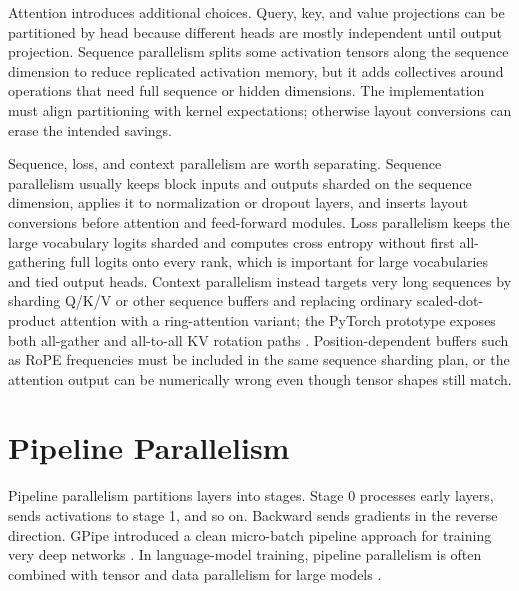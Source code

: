 Attention introduces additional choices. Query, key, and value projections can be partitioned by head because different heads are mostly independent until output projection. Sequence parallelism splits some activation tensors along the sequence dimension to reduce replicated activation memory, but it adds collectives around operations that need full sequence or hidden dimensions. The implementation must align partitioning with kernel expectations; otherwise layout conversions can erase the intended savings.

Sequence, loss, and context parallelism are worth separating. Sequence parallelism usually keeps block inputs and outputs sharded on the sequence dimension, applies it to normalization or dropout layers, and inserts layout conversions before attention and feed-forward modules. Loss parallelism keeps the large vocabulary logits sharded and computes cross entropy without first all-gathering full logits onto every rank, which is important for large vocabularies and tied output heads. Context parallelism instead targets very long sequences by sharding Q/K/V or other sequence buffers and replacing ordinary scaled-dot-product attention with a ring-attention variant; the PyTorch prototype exposes both all-gather and all-to-all KV rotation paths \cite{pytorch2025contextparallel}. Position-dependent buffers such as RoPE frequencies must be included in the same sequence sharding plan, or the attention output can be numerically wrong even though tensor shapes still match.

\section{Pipeline Parallelism}
\label{sec:pipeline-parallelism}

Pipeline parallelism partitions layers into stages. Stage 0 processes early layers, sends activations to stage 1, and so on. Backward sends gradients in the reverse direction. GPipe introduced a clean micro-batch pipeline approach for training very deep networks \cite{huang2019gpipe}. In language-model training, pipeline parallelism is often combined with tensor and data parallelism for large models \cite{narayanan2021efficient}.

